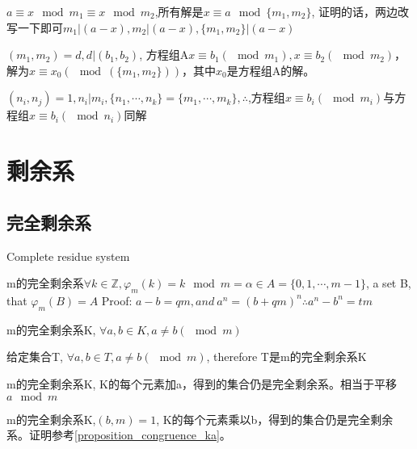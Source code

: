 \documentclass[UTF8]{../09-Mathematics}
\begin{document}
\begin{proposition}
    $a \equiv x \mod m_1  \equiv x \mod m_2$,所有解是$x \equiv a \mod \{ m_1, m_2\}$, 证明的话，两边改写一下即可$m_1|(a-x),m_2|(a-x),\{ m_1, m_2\}|(a-x) $
\end{proposition}

\begin{proposition}
    $(m_1, m_2) = d, d|(b_1, b_2)$, 方程组A$x \equiv b_1(\mod m_1  ), x \equiv b_2(\mod m_2  )$，解为$x \equiv x_0(\mod (\{ m_1, m_2\}))$，其中$x_0$是方程组A的解。
\end{proposition}

\begin{proposition}
    $(n_i, n_j) = 1, n_i | m_i, \{n_1, \cdots, n_k  \}= \{m_1, \cdots, m_k  \}, \therefore $,方程组$x \equiv b_i (\mod m_i)$与方程组$x \equiv b_i (\mod n_i)$同解
\end{proposition}


\section{剩余系}



\subsection{完全剩余系}

Complete residue system

\begin{proposition}
    m的完全剩余系$\forall k \in \mathbb Z, \varphi_m (k) =  k \mod m = \alpha \in A = \{ 0, 1, \cdots, m-1 \}$, a set B, that $ \varphi_m(B) = A$
    Proof: $a-b = q m, and \  a^n  =(b + qm)^n   \therefore a^n-b^n = tm$
\end{proposition}

\begin{proposition}
    m的完全剩余系K, $\forall a, b \in K, a \neq b (\mod m)$

    给定集合T, $\forall a, b \in T, a \neq b (\mod m)$, therefore T是m的完全剩余系K
\end{proposition}

\begin{proposition}
    m的完全剩余系K, K的每个元素加a，得到的集合仍是完全剩余系。相当于平移$a\mod m$

    m的完全剩余系K,$(b,m)= 1$, K的每个元素乘以b，得到的集合仍是完全剩余系。证明参考\ref{proposition_congruence_ka}。
\end{proposition}
\end{document}
